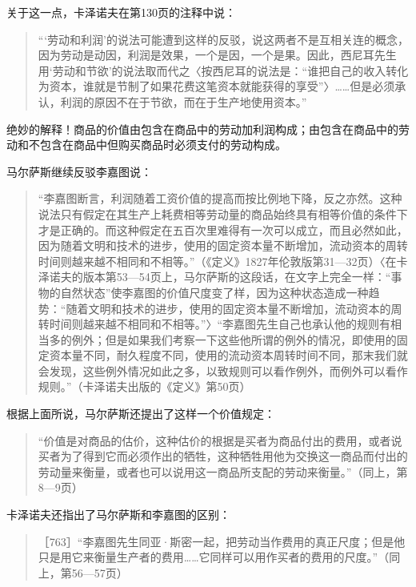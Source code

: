 关于这一点，卡泽诺夫在第130页的注释中说：

\begin{quote}{“‘劳动和利润’的说法可能遭到这样的反驳，说这两者不是互相关连的概念，因为劳动是动因，利润是效果，一个是因，一个是果。因此，西尼耳先生用‘劳动和节欲’的说法取而代之〈按西尼耳的说法是：“谁把自己的收入转化为资本，谁就是节制了如果花费这笔资本就能获得的享受”〉……但是必须承认，利润的原因不在于节欲，而在于生产地使用资本。”}\end{quote}

绝妙的解释！商品的价值由包含在商品中的劳动加利润构成；由包含在商品中的劳动和不包含在商品中但购买商品时必须支付的劳动构成。

马尔萨斯继续反驳李嘉图说：

\begin{quote}{“李嘉图断言，利润随着工资价值的提高而按比例地下降，反之亦然。这种说法只有假定在其生产上耗费相等劳动量的商品始终具有相等价值的条件下才是正确的。而这种假定在五百次里难得有一次可以成立，而且必然如此，因为随着文明和技术的进步，使用的固定资本量不断增加，流动资本的周转时间则越来越不相同和不相等。”（《定义》1827年伦敦版第31—32页）〈在卡泽诺夫的版本第53—54页上，马尔萨斯的这段话，在文字上完全一样：“事物的自然状态”使李嘉图的价值尺度变了样，因为这种状态造成一种趋势：“随着文明和技术的进步，使用的固定资本量不断增加，流动资本的周转时间则越来越不相同和不相等。”〉“李嘉图先生自己也承认他的规则有相当多的例外；但是如果我们考察一下这些他所谓的例外的情况，即使用的固定资本量不同，耐久程度不同，使用的流动资本周转时间不同，那末我们就会发现，这些例外情况如此之多，以致规则可以看作例外，而例外可以看作规则。”（卡泽诺夫出版的《定义》第50页）}\end{quote}


根据上面所说，马尔萨斯还提出了这样一个价值规定：

\begin{quote}{“价值是对商品的估价，这种估价的根据是买者为商品付出的费用，或者说买者为了得到它而必须作出的牺牲，这种牺牲用他为交换这一商品而付出的劳动量来衡量，或者也可以说用这一商品所支配的劳动来衡量。”（同上，第8—9页）}\end{quote}

卡泽诺夫还指出了马尔萨斯和李嘉图的区别：

\begin{quote}{［763］“李嘉图先生同亚·斯密一起，把劳动当作费用的真正尺度；但是他只是用它来衡量生产者的费用……它同样可以用作买者的费用的尺度。”（同上，第56—57页）}\end{quote}

